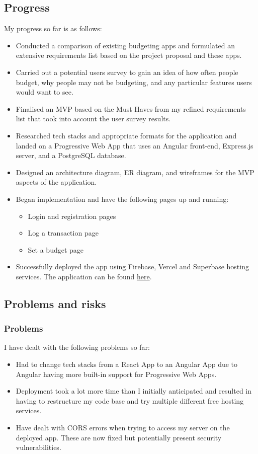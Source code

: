\documentclass[11pt]{article}
\begin{document}
\subsection{Progress}\label{progress}
My progress so far is as follows:
\begin{itemize}
    \item Conducted a comparison of existing budgeting apps and formulated an extensive requirements list based on the project proposal and these apps.
    \item Carried out a potential users survey to gain an idea of how often people budget, why people may not be budgeting, and any particular features users would want to see.
    \item Finalised an MVP based on the Must Haves from my refined requirements list that took into account the user survey results.
    \item Researched tech stacks and appropriate formats for the application and landed on a Progressive Web App that uses an Angular front-end, Express.js server, and a PostgreSQL database.
    \item Designed an architecture diagram, ER diagram, and wireframes for the MVP aspects of the application.
    \item Began implementation and have the following pages up and running:
    \begin{itemize}
        \item Login and registration pages
        \item Log a transaction page
        \item Set a budget page
    \end{itemize} 
    \item Successfully deployed the app using Firebase, Vercel and Superbase hosting services. The application can be found \href{https://evergreen-budgeting-app.web.app/home}{here}.
\end{itemize}

\subsection{Problems and risks}\label{problems-and-risks}

\subsubsection{Problems}\label{problems}
I have dealt with the following problems so far:
\begin{itemize}
    \item Had to change tech stacks from a React App to an Angular App due to Angular having more built-in support for Progressive Web Apps.
    \item Deployment took a lot more time than I initially anticipated and resulted in having to restructure my code base and try multiple different free hosting services.
    \item Have dealt with CORS errors when trying to access my server on the deployed app. These are now fixed but potentially present security vulnerabilities.
\end{itemize}
\end{document}
